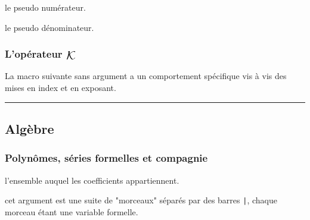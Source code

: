 \documentclass[12pt,a4paper]{article}
\theoremstyle{definition}
\newcommand\separation{
	\medskip
	\hfill\rule{0.5\textwidth}{0.75pt}\hfill
	\medskip
}
\newcommand\extraspace{
	\vspace{0.25em}
}
\begin{document}
 le pseudo numérateur.

 le pseudo dénominateur.





\subsubsection{\texorpdfstring{L'opérateur $\contfracope$}%
                          {L'opérateur K}}

La macro suivante sans argument a un comportement spécifique vis à vis des mises en index et en exposant. 


\separation


\subsection{Algèbre}

\subsubsection{Polynômes, séries formelles et compagnie}



\extraspace



\extraspace



 l'ensemble auquel les coefficients appartiennent.

 cet argument est une suite de "morceaux" séparés par des barres \verb+|+, chaque morceau étant une variable formelle.
\end{document}
